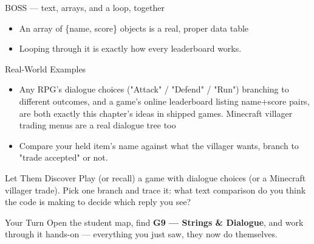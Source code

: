 \documentclass[aspectratio=169]{beamer}
\begin{document}
\begin{frame}{BOSS — text, arrays, and a loop, together}
    \large
    \begin{itemize}
        \item An array of \{name, score\} objects is a real, proper data table
        \item Looping through it is exactly how every leaderboard works.
    \end{itemize}
\end{frame}

\begin{frame}{Real-World Examples}
    \large
    \begin{itemize}
        \item Any RPG's dialogue choices ("Attack" / "Defend" / "Run") branching to different outcomes, and a game's online leaderboard listing name+score pairs, are both exactly this chapter's ideas in shipped games. Minecraft villager trading menus are a real dialogue tree too
        \item Compare your held item's name against what the villager wants, branch to "trade accepted" or not.
    \end{itemize}
\end{frame}


\begin{frame}{Let Them Discover}
    \Large
    Play (or recall) a game with dialogue choices (or a Minecraft villager trade). Pick one branch and trace it: what text comparison do you think the code is making to decide which reply you see?
\end{frame}

\begin{frame}{Your Turn}
    \Large
    Open the student map, find \textbf{G9 — Strings \& Dialogue}, and work through it
    hands-on --- everything you just saw, they now do themselves.
\end{frame}
\end{document}

